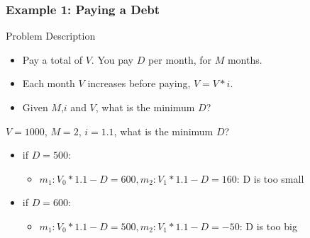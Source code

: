 \begin{frame}
  \frametitle{Example 1: Paying a Debt}

  \begin{block}{Problem Description}
    \begin{itemize}
      \item Pay a total of $V$. You pay $D$ per month, for $M$ months.
      \item Each month $V$ increases before paying, $V = V * i$.
      \item Given $M$,$i$ and $V$, what is the minimum $D$?
    \end{itemize}
  \end{block}
  \bigskip

  $V = 1000$, $M = 2$, $i = 1.1$, what is the minimum $D$?

  \begin{itemize}
  \item if $D = 500$:
    \begin{itemize}
    \item $m_1: V_0 * 1.1 - D = 600, m_2: V_1 * 1.1 - D = 160$: D is too small
    \end{itemize}
  \item if $D = 600$:
    \begin{itemize}
    \item $m_1: V_0 * 1.1 - D = 500, m_2: V_1 * 1.1 - D = -50$: D is too big
    \end{itemize}
  \end{itemize}
\end{frame}


